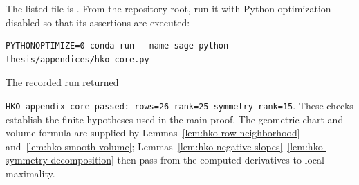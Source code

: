 The listed file is .
From the repository root, run it with Python optimization disabled so that
its assertions are executed:
\begin{lstlisting}[basicstyle=\ttfamily\footnotesize,columns=fullflexible]
PYTHONOPTIMIZE=0 conda run --name sage python thesis/appendices/hko_core.py
\end{lstlisting}
The recorded run returned\par\smallskip
\noindent
\texttt{HKO appendix core passed: rows=26 rank=25 symmetry-rank=15}.
These checks establish the finite hypotheses used in the main proof. The
geometric chart and volume formula are supplied by
Lemmas~\ref{lem:hko-row-neighborhood} and~\ref{lem:hko-smooth-volume};
Lemmas~\ref{lem:hko-negative-slopes}--\ref{lem:hko-symmetry-decomposition}
then pass from the computed derivatives to local maximality.
